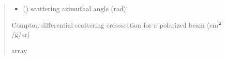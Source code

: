 \documentclass[letterpaper,10pt,english,openany,oneside]{sphinxmanual}
\begin{document}
\begin{fulllineitems}
\begin{quote}
\begin{description}
\begin{itemize}
\item {} 
\sphinxAtStartPar
{} () \textendash{} scattering azimuthal angle (rad)

\end{itemize}

\sphinxAtStartPar
Compton differential scattering cross\sphinxhyphen{}section for a polarized beam
(cm\(\sp{\text{2}}\)/g/sr)

\sphinxAtStartPar
array

\end{description}\end{quote}

\end{fulllineitems}


\begin{DUlineblock}{0em}
\item[] 
\end{DUlineblock}
\end{document}
